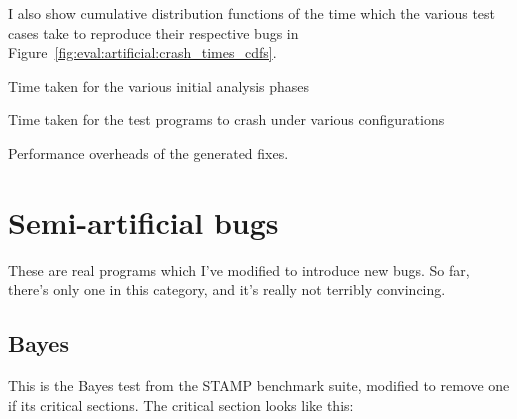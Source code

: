 I also show cumulative distribution functions of the time which the
various test cases take to reproduce their respective bugs in
Figure~\ref{fig:eval:artificial:crash_times_cdfs}.

\begin{sidewaystable}

\caption{Time taken for the various initial analysis phases}
\label{table:eval:analysis_phases}
\end{sidewaystable}

\begin{sidewaystable}

\caption{Time taken for the test programs to crash under various configurations}
\label{table:eval:crash_times}
\end{sidewaystable}

\begin{sidewaystable}

\caption{Performance overheads of the generated fixes.}  
\label{table:eval:perf_dists}
\end{sidewaystable}



\section{Semi-artificial bugs}

These are real programs which I've modified to introduce new bugs.  So
far, there's only one in this category, and it's really not terribly
convincing.

\subsection{Bayes}

This is the Bayes test from the STAMP benchmark suite, modified to
remove one if its critical sections.  The critical section looks like
this:

